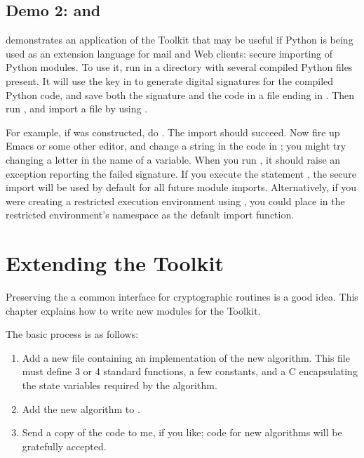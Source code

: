 \documentclass{howto}
\begin{document}
\subsection{Demo 2:  and }

 demonstrates an application of the Toolkit that may be
useful if Python is being used as an extension language for mail and Web
clients: secure importing of Python modules.  To use it, run
 in a directory with several compiled Python files
present.  It will use the key in  to generate digital
signatures for the compiled Python code, and save both the signature and
the code in a file ending in .  Then run , and import a file by using .  

For example, if  was constructed, do
.  The import should succeed.  Now fire up Emacs
or some other editor, and change a string in the code in ;
you might try changing a letter in the name of a variable.  When you run
, it should raise an exception reporting the
failed signature.  If you execute the statement , the secure import will be used by default for all future
module imports.  Alternatively, if you were creating a restricted
execution environment using , you could place
 in the restricted environment's namespace as the
default import function.


\section{Extending the Toolkit}

Preserving the a common interface for cryptographic routines is a good
idea.  This chapter explains how to write new modules for the Toolkit.

The basic process is as follows:
\begin{enumerate}

\item Add a new  file containing an implementation of the new
algorithm.  
This file must define 3 or 4 standard functions,
a few constants, and a C  encapsulating the state variables required by the algorithm.

\item  Add the new algorithm to .

\item  Send a copy of the code to me, if you like; code for new
algorithms will be gratefully accepted.
\end{enumerate}
\end{document}
